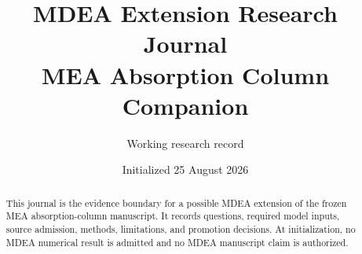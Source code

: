 \documentclass[11pt]{article}
\title{MDEA Extension Research Journal\\\large MEA Absorption Column Companion}
\author{Working research record}
\date{Initialized 25 August 2026}
\begin{document}
\maketitle

\begin{abstract}
This journal is the evidence boundary for a possible MDEA extension of the frozen MEA
absorption-column manuscript. It records questions, required model inputs, source admission,
methods, limitations, and promotion decisions. At initialization, no MDEA numerical result is
admitted and no MDEA manuscript claim is authorized.
\end{abstract}








\end{document}
